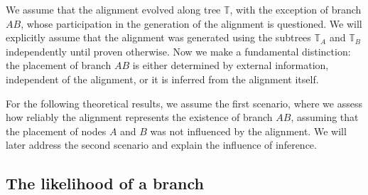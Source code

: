 \medskip
 
We assume that the alignment evolved along tree $\mathbb{T}$, with the exception of branch $AB$, whose participation in the generation of the alignment is questioned. We will explicitly assume that the alignment was generated using the subtrees $\mathbb{T}_A$ and $\mathbb{T}_B$ independently until proven otherwise. Now we make a fundamental distinction: the placement of branch $AB$ is either determined by external information, independent of the alignment, or it is inferred from the alignment itself. 

\medskip
For the following theoretical results, we assume the first scenario, where we assess how reliably the alignment represents the existence of branch $AB$, assuming that the placement of nodes $A$ and $B$ was not influenced by the alignment. We will later address the second scenario and explain the influence of inference.

\subsection{The likelihood of a branch}\label{msec:branch likelihood}


